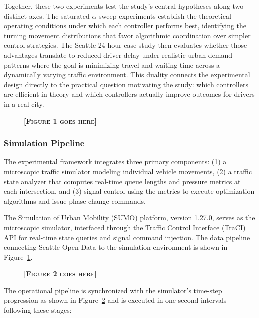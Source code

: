 \documentclass[12pt]{article}
\begin{document}
Together, these two experiments test the study's central hypotheses along two distinct axes. The saturated $\alpha$-sweep experiments establish the theoretical operating conditions under which each controller performs best, identifying the turning movement distributions that favor algorithmic coordination over simpler control strategies. The Seattle 24-hour case study then evaluates whether those advantages translate to reduced driver delay under realistic urban demand patterns where the goal is minimizing travel and waiting time across a dynamically varying traffic environment. This duality connects the experimental design directly to the practical question motivating the study: which controllers are efficient in theory and which controllers actually improve outcomes for drivers in a real city.


\begin{figure}[H]
\centering
\vspace{-2mm}
\textbf{\textsc{[Figure 1 goes here]}}
\label{fig:seattle-pipeline}
\vspace{-3mm}
\end{figure}

\subsubsection{Simulation Pipeline}

The experimental framework integrates three primary components: (1) a microscopic traffic simulator modeling individual vehicle movements, (2) a traffic state analyzer that computes real-time queue lengths and pressure metrics at each intersection, and (3) signal control using the metrics to execute optimization algorithms and issue phase change commands.

The Simulation of Urban Mobility (SUMO) platform, version 1.27.0, serves as the microscopic simulator, interfaced through the Traffic Control Interface (TraCI) API for real-time state queries and signal command injection. The data pipeline connecting Seattle Open Data to the simulation environment is shown in Figure~\ref{fig:seattle-pipeline}.

\begin{figure}[H]
\centering
\vspace{-2mm}
\textbf{\textsc{[Figure 2 goes here]}}\\
\label{fig:control-loop}
\vspace{-3mm}
\end{figure}

The operational pipeline is synchronized with the simulator's time-step progression as shown in Figure~\ref{fig:control-loop} and is executed in one-second intervals following these stages:
\end{document}
